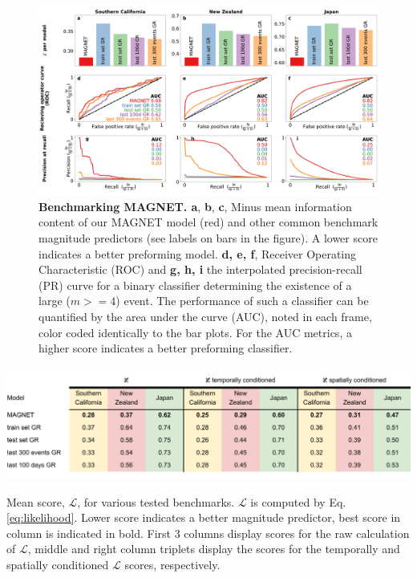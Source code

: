\documentclass[pdflatex]{sn-jnl}
\begin{document}
\begin{figure}[h!]
    \centering
    \includegraphics[width=1\textwidth]{figures/combined_barplots.pdf}
    \caption{
        \textbf{Benchmarking MAGNET. a}, \textbf{b}, \textbf{c}, Minus mean information content of our MAGNET model (red) and other common benchmark magnitude predictors (see labels on bars in the figure). A lower score indicates a better preforming model. \textbf{d, e, f}, Receiver Operating Characteristic (ROC) and \textbf{g, h, i} the interpolated precision-recall (PR) curve for a binary classifier determining the existence of a large ($m>=4$) event. The performance of such a classifier can be quantified by the area under the curve (AUC), noted in each frame, color coded identically to the bar plots. For the AUC metrics, a higher score indicates a better preforming classifier.
        }
        \label{fig:metrics}
\end{figure}


\begin{table}[h!]
    \centering
    \includegraphics[width=1\textwidth]{figures/score_tables_main.pdf}
    \caption{Mean score, $\mathcal{L}$, for various tested benchmarks. $\mathcal{L}$ is computed by Eq. \ref{eq:likelihood}. Lower score indicates a better magnitude predictor, best score in column is indicated in bold. First 3 columns display scores for the raw calculation of $\mathcal{L}$, middle and right column triplets display the scores for the temporally and spatially conditioned $\mathcal{L}$ scores, respectively.
    }
    \label{tab:mean_ll_benchmarks_main_text}
\end{table}
   
\end{document}
